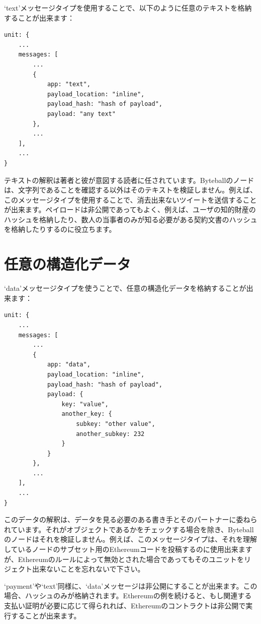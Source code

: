 \documentclass[a4paper, dvipdfmx]{jsarticle}
\begin{document}
`text'メッセージタイプを使用することで、以下のように任意のテキストを格納することが出来ます：

\begin{lstlisting}[basicstyle=\ttfamily\footnotesize, frame=none]
unit: {
    ...
    messages: [
        ...
        {
            app: "text",
            payload_location: "inline",
            payload_hash: "hash of payload",
            payload: "any text"
        },
        ...
    ],
    ...
}
\end{lstlisting}

\noindent テキストの解釈は著者と彼が意図する読者に任されています。Byteballのノードは、文字列であることを確認する以外はそのテキストを検証しません。例えば、このメッセージタイプを使用することで、消去出来ないツイートを送信することが出来ます。ペイロードは非公開であってもよく、例えば、ユーザの知的財産のハッシュを格納したり、数人の当事者のみが知る必要がある契約文書のハッシュを格納したりするのに役立ちます。


\section{任意の構造化データ}
`data'メッセージタイプを使うことで、任意の構造化データを格納することが出来ます：

\begin{lstlisting}[basicstyle=\ttfamily\footnotesize, frame=none]
unit: {
    ...
    messages: [
        ...
        {
            app: "data",
            payload_location: "inline",
            payload_hash: "hash of payload",
            payload: {
                key: "value",
                another_key: {
                    subkey: "other value",
                    another_subkey: 232
                }
            }
        },
        ...
    ],
    ...
}
\end{lstlisting}

\noindent このデータの解釈は、データを見る必要のある書き手とそのパートナーに委ねられています。それがオブジェクトであるかをチェックする場合を除き、Byteballのノードはそれを検証しません。例えば、このメッセージタイプは、それを理解しているノードのサブセット用のEthereumコードを投稿するのに使用出来ますが、Ethereumのルールによって無効とされた場合であってもそのユニットをリジェクト出来ないことを忘れないで下さい。

`payment'や`text'同様に、`data'メッセージは非公開にすることが出来ます。この場合、ハッシュのみが格納されます。Ethereumの例を続けると、もし関連する支払い証明が必要に応じて得られれば、Ethereumのコントラクトは非公開で実行することが出来ます。
\end{document}
